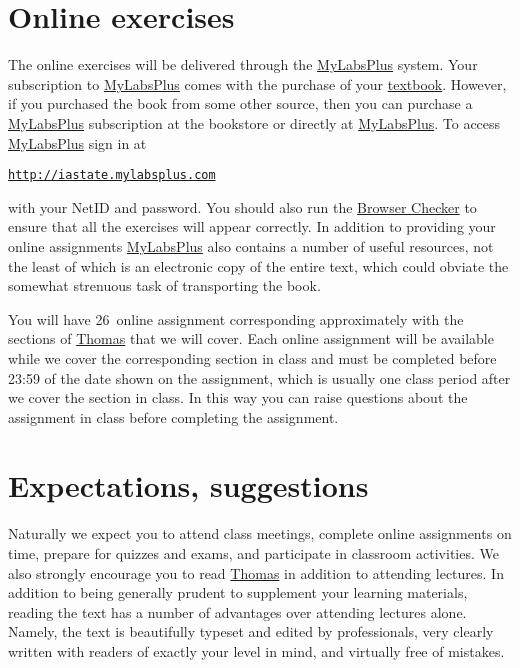 \documentclass[11pt]{article}
\begin{document}
\section{Online exercises}\label{Online}
The online exercises will be delivered through the
\href{http://iastate.mylabsplus.com}{MyLabsPlus} system.
Your subscription to 
\href{http://iastate.mylabsplus.com}{MyLabsPlus}
comes with the purchase of your
\href{http://wps.aw.com/aw_thomas_calculus_series}{textbook}.
However, if you purchased the book from some other source,
then you can purchase a 
\href{http://iastate.mylabsplus.com}{MyLabsPlus}
subscription at the bookstore or directly at
\href{http://iastate.mylabsplus.com}{MyLabsPlus}.
To access
\href{http://iastate.mylabsplus.com}{MyLabsPlus}
sign in at
\begin{center}
\href{http://iastate.mylabsplus.com}{\tt http://iastate.mylabsplus.com}
\end{center}
with your NetID and password.
You should also run the
\href{https://www.mathxl.com/BrowserCheck/BrowserCheck.aspx?appproductid=3&courseid=2744761&handler_urn=pearson%2fmlp_mml_xl%2fslink%2fx-pearson-mlp_mml_xl&productid=ccng}{Browser Checker}
to ensure that all the exercises will appear correctly.
In addition to providing your online assignments
\href{http://iastate.mylabsplus.com}{MyLabsPlus}
also contains a number of useful resources, not the least of which is an
electronic copy of the entire text, which could obviate
the somewhat strenuous task of transporting the book.

You will have 26~online assignment corresponding
approximately with the sections of 
\href{http://wps.aw.com/aw_thomas_calculus_series}{Thomas}
that we will cover. Each online assignment will be available while we cover the
corresponding section in class and must be completed
before 23:59 of the date shown on the assignment, which
is usually one class period after we cover the section in class.
In this way you can raise questions about
the assignment in class before completing the assignment.

\section{Expectations, suggestions} Naturally we expect you to attend 
class meetings, complete online assignments on 
time, prepare for quizzes and exams, and participate in classroom 
activities. We also strongly encourage you to read
\href{http://wps.aw.com/aw_thomas_calculus_series}{Thomas}
in addition to attending lectures.
In addition to being generally prudent to 
supplement your learning materials, reading the text has a number of 
advantages over attending lectures alone. Namely, the text is beautifully 
typeset and edited by professionals, very clearly written with readers 
of exactly your level in mind, and virtually free of mistakes.
\end{document}
